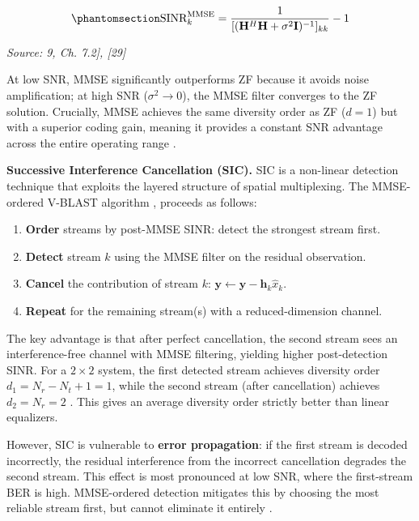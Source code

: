 \begin{equation}\protect\phantomsection\label{eq:mmse-sinr}{\text{SINR}_k^{\text{MMSE}} = \frac{1}{[(\mathbf{H}^H\mathbf{H} + \sigma^2\mathbf{I})^{-1}]_{kk}} - 1
}\end{equation} \par{\small\textit{Source: \cite{Laneman2004CooperativeDiversity}9, Ch. 7.2], [29]}}

At low SNR, MMSE significantly outperforms ZF because it avoids noise amplification; at high SNR (\(\sigma^2 \to 0\)), the MMSE filter converges to the ZF solution. Crucially, MMSE achieves the same diversity order as ZF (\(d = 1\)) but with a superior coding gain, meaning it provides a constant SNR advantage across the entire operating range \cite{TseHanly1999LinearMultiuser}.

\textbf{Successive Interference Cancellation (SIC).} SIC is a non-linear detection technique that exploits the layered structure of spatial multiplexing. The MMSE-ordered V-BLAST algorithm \cite{Wolniansky1998VBLAST}, \cite{Foschini1996LayeredST} proceeds as follows:

\begin{enumerate}
\def\labelenumi{\arabic{enumi}.}
\tightlist
\item
  \textbf{Order} streams by post-MMSE SINR: detect the strongest stream first.
\item
  \textbf{Detect} stream \(k\) using the MMSE filter on the residual observation.
\item
  \textbf{Cancel} the contribution of stream \(k\): \(\mathbf{y} \leftarrow \mathbf{y} - \mathbf{h}_k \hat{x}_k\).
\item
  \textbf{Repeat} for the remaining stream(s) with a reduced-dimension channel.
\end{enumerate}

The key advantage is that after perfect cancellation, the second stream sees an interference-free channel with MMSE filtering, yielding higher post-detection SINR. For a \(2 \times 2\) system, the first detected stream achieves diversity order \(d_1 = N_r - N_t + 1 = 1\), while the second stream (after cancellation) achieves \(d_2 = N_r = 2\) \cite{ZhengTse2003DMT}. This gives an average diversity order strictly better than linear equalizers.

However, SIC is vulnerable to \textbf{error propagation}: if the first stream is decoded incorrectly, the residual interference from the incorrect cancellation degrades the second stream. This effect is most pronounced at low SNR, where the first-stream BER is high. MMSE-ordered detection mitigates this by choosing the most reliable stream first, but cannot eliminate it entirely \cite{LoykaGagnon2004VBLASTAnalysis}.

